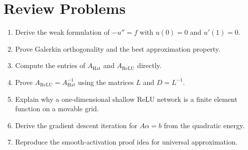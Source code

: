 \documentclass[11pt,a4paper]{article}
\newcommand{\Ah}{A_{\mathrm{Hat}}}
\newcommand{\Ar}{A_{\mathrm{ReLU}}}
\theoremstyle{definition}
\theoremstyle{plain}
\theoremstyle{remark}
\begin{document}
\section*{Review Problems}
\begin{enumerate}
  \item Derive the weak formulation of $-u''=f$ with $u(0)=0$ and $u'(1)=0$.
  \item Prove Galerkin orthogonality and the best approximation property.
  \item Compute the entries of $\Ah$ and $\Ar$ directly.
  \item Prove $\Ar=\Ah^{-1}$ using the matrices $L$ and $D=L^{-1}$.
  \item Explain why a one-dimensional shallow ReLU network is a finite element function on a movable grid.
  \item Derive the gradient descent iteration for $A\alpha=b$ from the quadratic energy.
  \item Reproduce the smooth-activation proof idea for universal approximation.
\end{enumerate}
\end{document}
